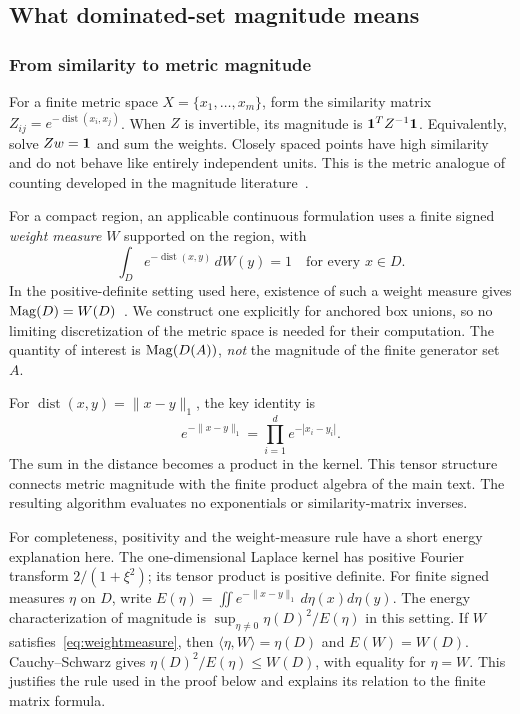 \subsection{What dominated-set magnitude means}
\label{sec:magnitude}

\subsubsection{From similarity to metric magnitude}
For a finite metric space $X=\{x_1,\ldots,x_m\}$, form the similarity
matrix $Z_{ij}=e^{-\operatorname{dist}(x_i,x_j)}$. When $Z$ is invertible,
its magnitude is $\mathbf 1^TZ^{-1}\mathbf 1$. Equivalently, solve $Zw=\mathbf 1$ and
sum the weights. Closely spaced points have high similarity and do not
behave like entirely independent units. This is the metric analogue of
counting developed in the magnitude literature~\cite{leinstermeckes2017}.

For a compact region, an applicable continuous formulation uses a finite
signed \emph{weight measure} $W$ supported on the region, with
\begin{equation}
 \int_D e^{-\operatorname{dist}(x,y)}\,dW(y)=1
                    \quad\text{for every }x\in D.
 \label{eq:weightmeasure}
\end{equation}
In the positive-definite setting used here, existence of such a weight
measure gives $\operatorname{Mag}(D)=W(D)$~\cite{leinstermeckes2017}. We construct one
explicitly for anchored box unions, so no limiting discretization of the
metric space is needed for their computation. The quantity of interest is
$\operatorname{Mag}(D(A))$, \emph{not} the magnitude of the finite generator set $A$.

For $\operatorname{dist}(x,y)=\|x-y\|_1$, the key identity is
\begin{equation}
 e^{-\|x-y\|_1}=\prod_{i=1}^d e^{-|x_i-y_i|}.
 \label{eq:exp-product}
\end{equation}
The sum in the distance becomes a product in the kernel. This tensor
structure connects metric magnitude with the finite product algebra of
the main text. The resulting algorithm evaluates no exponentials or
similarity-matrix inverses.

For completeness, positivity and the weight-measure rule have a short
energy explanation here. The one-dimensional Laplace kernel has positive
Fourier transform $2/(1+\xi^2)$; its tensor product is positive definite.
For finite signed measures $\eta$ on $D$, write
$E(\eta)=\iint e^{-\|x-y\|_1}\,d\eta(x)d\eta(y)$.
The energy characterization of magnitude is
$\sup_{\eta\ne0}\eta(D)^2/E(\eta)$ in this setting.
If $W$ satisfies~\eqref{eq:weightmeasure}, then
$\langle\eta,W\rangle=\eta(D)$ and $E(W)=W(D)$.
Cauchy--Schwarz gives $\eta(D)^2/E(\eta)\le W(D)$, with equality
for $\eta=W$. This justifies the rule used in the proof below and
explains its relation to the finite matrix formula.


